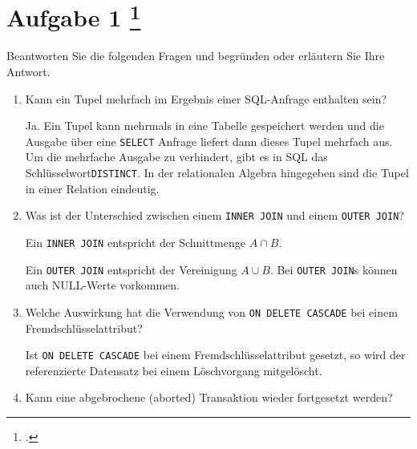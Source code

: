 \documentclass{lehramt-informatik-aufgabe}
\begin{document}
\section{Aufgabe 1
\footcite{66116:2021:03}}

Beantworten Sie die folgenden Fragen und begründen oder erläutern Sie
Ihre Antwort.

\begin{enumerate}


\item Kann ein Tupel mehrfach im Ergebnis einer SQL-Anfrage enthalten
sein?

\begin{liAntwort}
Ja. Ein Tupel kann mehrmals in eine Tabelle gespeichert werden und die
Ausgabe über eine \texttt{SELECT} Anfrage liefert dann dieses Tupel
mehrfach aus. Um die mehrfache Ausgabe zu verhindert, gibt es in SQL das
Schlüsselwort\texttt{DISTINCT}. In der relationalen Algebra hingegeben
sind die Tupel in einer Relation eindeutig.
\end{liAntwort}


\item Was ist der Unterschied zwischen einem \texttt{INNER JOIN} und
einem \texttt{OUTER JOIN}?

\begin{liAntwort}
Ein \texttt{INNER JOIN} entspricht der Schnittmenge $A \cap B$.

Ein \texttt{OUTER JOIN} entspricht der Vereinigung $A \cup B$. Bei
\texttt{OUTER JOIN}s können auch NULL-Werte vorkommen.
\end{liAntwort}


\item Welche Auswirkung hat die Verwendung von \texttt{ON DELETE
CASCADE} bei einem Fremdschlüsselattribut?

\begin{liAntwort}
Ist \texttt{ON DELETE CASCADE} bei einem Fremdschlüsselattribut gesetzt,
so wird der referenzierte Datensatz bei einem Löschvorgang mitgelöscht.
\end{liAntwort}


\item Kann eine abgebrochene (aborted) Transaktion wieder fortgesetzt
werden?


\end{enumerate}
\end{document}

